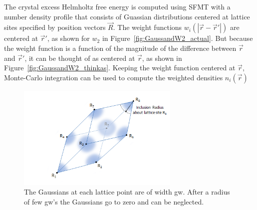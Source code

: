 \documentclass[double,12pt]{beavtex}
\begin{document}
The crystal excess Helmholtz free energy is computed  
using SFMT with a number density profile 
that consists of Guassian distributions 
centered at lattice sites specified by position vectors $\vec R$. 
The weight functions $w_i(|\vec r - \vec r'|)$ are centered at $\vec r'$,
as shown for $w_2$ in Figure~\ref{fig:GaussandW2_actual}. 
But because the weight function is a function of the magnitude of the 
difference between $\vec r$ and $\vec r'$, it can be thought of as 
centered at $\vec r$, as shown in Figure~\ref{fig:GaussandW2_thinkas}. 
Keeping the weight function centered at $\vec r$, 
Monte-Carlo integration can be used to compute the weighted densities $n_i(\vec r)$
%
\begin{figure}[h!]
   \centering
   \includegraphics[height=5cm]{InclusionRadius.png}
   \caption{The Gaussians at each lattice point are of width gw. 
   After a radius of few gw's the Gaussians go to zero and can be neglected.}
   \label{fig:InclusionRadius}
\end{figure} 
%
\end{document}
